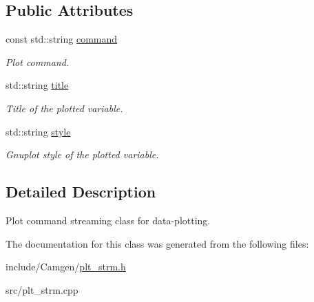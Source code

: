 \subsection*{Public Attributes}
\begin{DoxyCompactItemize}
\item 
\hypertarget{a00115_aa1c1d0322045902c0813999b6716bc5f}{}const std\+::string \hyperlink{a00115_aa1c1d0322045902c0813999b6716bc5f}{command}\label{a00115_aa1c1d0322045902c0813999b6716bc5f}

\begin{DoxyCompactList}\small\item\em Plot command. \end{DoxyCompactList}\item 
\hypertarget{a00115_ae5d24d01b312a2cbfce93a0edbb5de83}{}std\+::string \hyperlink{a00115_ae5d24d01b312a2cbfce93a0edbb5de83}{title}\label{a00115_ae5d24d01b312a2cbfce93a0edbb5de83}

\begin{DoxyCompactList}\small\item\em Title of the plotted variable. \end{DoxyCompactList}\item 
\hypertarget{a00115_a879cb4f17927d1fe3fa384b9ce878237}{}std\+::string \hyperlink{a00115_a879cb4f17927d1fe3fa384b9ce878237}{style}\label{a00115_a879cb4f17927d1fe3fa384b9ce878237}

\begin{DoxyCompactList}\small\item\em Gnuplot style of the plotted variable. \end{DoxyCompactList}\end{DoxyCompactItemize}


\subsection{Detailed Description}
Plot command streaming class for data-\/plotting. 

The documentation for this class was generated from the following files\+:\begin{DoxyCompactItemize}
\item 
include/\+Camgen/\hyperlink{a00724}{plt\+\_\+strm.\+h}\item 
src/plt\+\_\+strm.\+cpp\end{DoxyCompactItemize}

